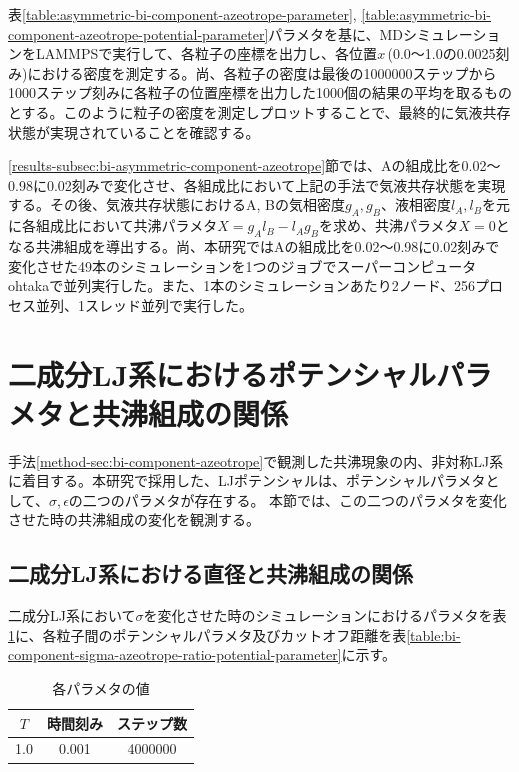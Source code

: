 \documentclass[titlepage]{jsreport}
\begin{document}
表\ref{table:asymmetric-bi-component-azeotrope-parameter}, \ref{table:asymmetric-bi-component-azeotrope-potential-parameter}パラメタを基に、MDシミュレーションをLAMMPSで実行して、各粒子の座標を出力し、各位置$x$\,(0.0〜1.0の0.0025刻み)における密度を測定する。尚、各粒子の密度は最後の1000000ステップから1000ステップ刻みに各粒子の位置座標を出力した1000個の結果の平均を取るものとする。このように粒子の密度を測定しプロットすることで、最終的に気液共存状態が実現されていることを確認する。

\ref{results-subsec:bi-asymmetric-component-azeotrope}節では、Aの組成比を0.02〜0.98に0.02刻みで変化させ、各組成比において上記の手法で気液共存状態を実現する。その後、気液共存状態におけるA, Bの気相密度$g_A, g_B$、液相密度$l_A, l_B$を元に各組成比において共沸パラメタ$X=g_Al_B-l_Ag_B$を求め、共沸パラメタ$X=0$となる共沸組成を導出する。尚、本研究ではAの組成比を0.02〜0.98に0.02刻みで変化させた49本のシミュレーションを1つのジョブでスーパーコンピュータohtakaで並列実行した。また、1本のシミュレーションあたり2ノード、256プロセス並列、1スレッド並列で実行した。


\section{二成分LJ系におけるポテンシャルパラメタと共沸組成の関係} \label{method-sec:bi-component-potential-parameter-azeotrope-ratio}
手法\ref{method-sec:bi-component-azeotrope}で観測した共沸現象の内、非対称LJ系に着目する。本研究で採用した、LJポテンシャルは、ポテンシャルパラメタとして、${\sigma}$,\,${\epsilon}$の二つのパラメタが存在する。
本節では、この二つのパラメタを変化させた時の共沸組成の変化を観測する。


\subsection{二成分LJ系における直径と共沸組成の関係} \label{method-subsec:bi-component-sigma-azeotrope-ratio}
二成分LJ系において${\sigma}$を変化させた時のシミュレーションにおけるパラメタを表\ref{table:bi-component-sigma-azeotrope-ratio-parameter}に、各粒子間のポテンシャルパラメタ及びカットオフ距離を表\ref{table:bi-component-sigma-azeotrope-ratio-potential-parameter}に示す。

\begin{table}[htbp]
    \begin{center}
        \caption{各パラメタの値}
        \label{table:bi-component-sigma-azeotrope-ratio-parameter}
        \begin{tabular}{c c c}
            $T$ & 時間刻み & ステップ数 \\
            \hline
            1.0 & 0.001 & 4000000 \\
        \end{tabular}
    \end{center}
\end{table}
\end{document}
